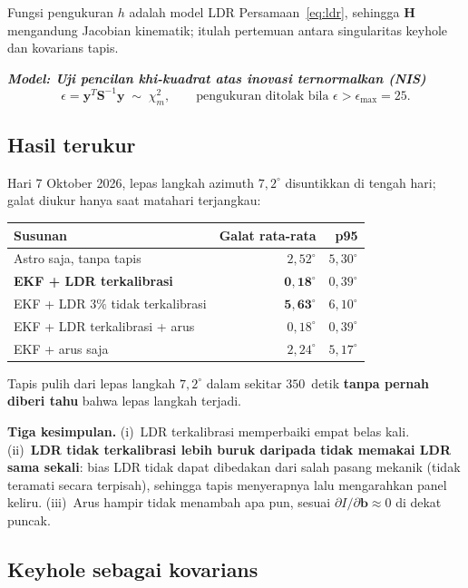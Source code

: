 \documentclass[11pt,a4paper]{article}
\newcommand{\degg}{^\circ}
\newcommand{\model}[1]{\textbf{\textit{Model: #1}}}
\begin{document}
Fungsi pengukuran $h$ adalah model LDR Persamaan~\eqref{eq:ldr}, sehingga $\bm{H}$ mengandung Jacobian
kinematik; itulah pertemuan antara singularitas keyhole dan kovarians tapis.

\model{Uji pencilan khi-kuadrat atas inovasi ternormalkan (NIS)}
\begin{equation}
\epsilon = \bm{y}^T \bm{S}^{-1} \bm{y} \;\sim\; \chi^2_{m}, \qquad
\text{pengukuran ditolak bila } \epsilon > \epsilon_{\max} = 25 .
\end{equation}

\subsection{Hasil terukur}

Hari 7 Oktober 2026, lepas langkah azimuth $7{,}2\degg$ disuntikkan di tengah hari; galat diukur hanya saat
matahari terjangkau:

\begin{longtable}{l r r}
\toprule
\textbf{Susunan} & \textbf{Galat rata-rata} & \textbf{p95} \\
\midrule
Astro saja, tanpa tapis & $2{,}52\degg$ & $5{,}30\degg$ \\
\textbf{EKF + LDR terkalibrasi} & $\bm{0{,}18\degg}$ & $0{,}39\degg$ \\
EKF + LDR $3\%$ tidak terkalibrasi & $\bm{5{,}63\degg}$ & $6{,}10\degg$ \\
EKF + LDR terkalibrasi + arus & $0{,}18\degg$ & $0{,}39\degg$ \\
EKF + arus saja & $2{,}24\degg$ & $5{,}17\degg$ \\
\bottomrule
\end{longtable}

Tapis pulih dari lepas langkah $7{,}2\degg$ dalam sekitar $350$~detik \textbf{tanpa pernah diberi tahu}
bahwa lepas langkah terjadi.

\textbf{Tiga kesimpulan.} (i)~LDR terkalibrasi memperbaiki empat belas kali. (ii)~\textbf{LDR tidak
terkalibrasi lebih buruk daripada tidak memakai LDR sama sekali}: bias LDR tidak dapat dibedakan dari salah
pasang mekanik (tidak teramati secara terpisah), sehingga tapis menyerapnya lalu mengarahkan panel keliru.
(iii)~Arus hampir tidak menambah apa pun, sesuai $\partial I/\partial \bm{b} \approx 0$ di dekat puncak.

\subsection{Keyhole sebagai kovarians}
\end{document}
